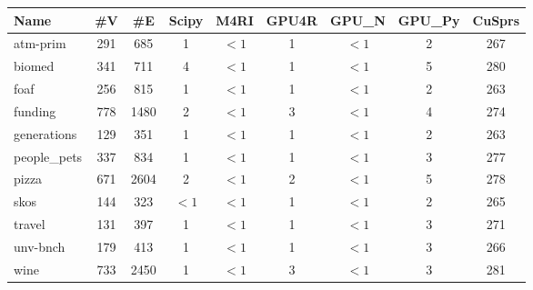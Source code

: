 \documentclass[xcolor=table]{beamer}
\newcommand{\ltz}{$< 1$}
\begin{document}
\begin{frame}[fragile]
\begin{center}
{\begin{tabular}{| p{1.25cm} | c | c | c | c | c | c | c | c | }
          \hline
          Name                                & \#V & \#E  & Scipy & M4RI  & GPU4R & GPU\_N & GPU\_Py & CuSprs \\
          \hline
          \hline
          \tiny{atm-prim}                    & 291 & 685   & 1     & \ltz & 1     & \ltz   & 2       & 267  \\
          \tiny{biomed}                      & 341 & 711   & 4     & \ltz & 1     & \ltz   & 5       & 280  \\
          \tiny{foaf}                        & 256 & 815   & 1     & \ltz & 1     & \ltz   & 2       & 263  \\
          \tiny{funding}                     & 778 & 1480  & 2     & \ltz & 3     & \ltz   & 4       & 274  \\
          \tiny{generations}                 & 129 & 351   & 1     & \ltz & 1     & \ltz   & 2       & 263  \\
          \tiny{people\_pets}                & 337 & 834   & 1     & \ltz & 1     & \ltz   & 3       & 277  \\
          \tiny{pizza}                       & 671 & 2604  & 2     & \ltz & 2     & \ltz   & 5       & 278  \\
          \tiny{skos}                        & 144 & 323   & \ltz  & \ltz & 1     & \ltz   & 2       & 265  \\
          \tiny{travel}                      & 131 & 397   & 1     & \ltz & 1     & \ltz   & 3       & 271  \\
          \tiny{unv-bnch}                    & 179 & 413   & 1     & \ltz & 1     & \ltz   & 3       & 266  \\
          \tiny{wine}                        & 733 & 2450  & 1     & \ltz & 3     & \ltz   & 3       & 281  \\
          \hline
        \end{tabular}
        }
        \end{center}

\end{frame}
\end{document}
